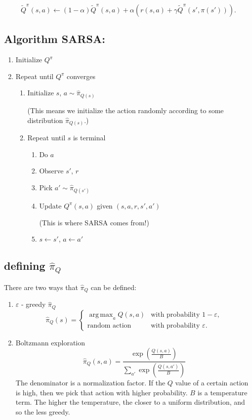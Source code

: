 \documentclass[11pt]{article}
\numberwithin{equation}{section}
\numberwithin{figure}{section}
\begin{document}
\begin{equation}
    \tilde{Q}^\pi(s,a) \leftarrow  (1 - \alpha) \tilde{Q}^\pi(s,a) + \alpha \left(r(s,a) + \gamma \tilde{Q}^\pi(s',\pi(s')) \right). 
	\label{eq.sarsaUpdate}
\end{equation}
\subsection*{Algorithm SARSA:}
\begin{enumerate}
	\item Initialize $Q^\pi$
	\item Repeat until $Q^\pi$ converges
	\begin{enumerate}
		\item Initialize $s$, $a \sim \hat{\pi}_{Q(s)}$

		(This means we initialize the action randomly according to some distribution $\hat{\pi}_{Q(s)}$.)
		\item Repeat until $s$ is terminal
		\begin{enumerate}
			\item Do $a$
			\item Observe $s'$, $r$
			\item Pick $a' \sim \hat{\pi}_{Q(s')}$
			\item Update $Q^\pi(s,a)$ given $(s, a, r, s', a')$
			
			(This is where SARSA comes from!)
			\item $s \leftarrow s'$, $a \leftarrow a'$ 
		\end{enumerate}
	\end{enumerate}
\end{enumerate}

\subsection*{defining $\hat{\pi}_Q$}
There are two ways that $\hat{\pi}_Q$ can be defined:
\begin{enumerate}
	\item $\varepsilon$ - greedy $\hat{\pi}_Q$
		\begin{equation}
			\hat{\pi}_Q(s) = 
			\begin{cases}
				\operatorname{arg\,max}_{a}Q(s,a) & \text{with probability } 1 - \varepsilon, \\
				\text{random action} & \text{with probability } \varepsilon.
			\end{cases}
		\end{equation}
	\item Boltzmann exploration
		\begin{equation}
			\hat{\pi}_Q(s,a) =\frac{\exp(\frac{Q(s,a)}{B})}{\sum_{a'}\exp(\frac{Q(s,a')}{B})}
		\end{equation}
		The denominator is a normalization factor.  If the $Q$ value of a certain action is high, then we pick that action with higher probability.  $B$ is a temperature term.  The higher the temperature, the closer to a uniform distribution, and so the less greedy.
\end{enumerate}
\end{document}
